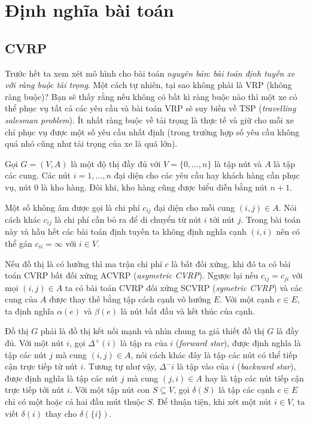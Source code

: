 \section{Định nghĩa bài toán}

\subsection{CVRP}

Trước hết ta xem xét mô hình cho bài toán \textit{nguyên bản}: \textit{bài toán định tuyến xe với ràng buộc tải trọng}. Một cách tự nhiên, tại sao không phải là VRP (không ràng buộc)? Bạn sẽ thấy rằng nếu không có bất kì ràng buộc nào thì một xe có thể phục vụ tất cả các yêu cầu và bài toán VRP sẽ suy biến về TSP (\textit{travelling salesman problem}). Ít nhất ràng buộc về tải trọng là thực tế và giữ cho mỗi xe chỉ phục vụ được một số yêu cầu nhất định (trong trường hợp số yêu cầu không quá nhỏ cũng như tải trọng của xe là quá lớn).


Gọi $G=(V,A)$ là một độ thị đầy đủ với $V=\{ 0, ..., n \}$ là tập nút và $A$ là tập các cung. Các nút $i=1,...,n$ đại diện cho các yêu cầu hay khách hàng cần phục vụ, nút $0$ là kho hàng. Đôi khi, kho hàng cũng được biểu diễn bằng nút $n+1$.

Một số không âm được gọi là chi phí $c_{ij}$ đại diện cho mỗi cung $(i,j) \in A$. Nói cách khác $c_{ij}$ là  chi phí cần bỏ ra để di chuyển từ nút $i$ tới nút $j$. Trong bài toán này và hầu hết các bài toán định tuyến ta không định nghĩa cạnh $(i,i)$ nên có thể gán $c_{ii} = \infty$ với $i \in V$.

Nếu đồ thị là có hướng thì ma trận chi phí $c$ là bất đối xứng, khi đó ta có bài toán CVRP bất đối xứng ACVRP (\textit{asymetric CVRP}). Ngược lại nếu $c_{ij} = c_{ji}$ với mọi $(i,j) \in A$ ta có bài toán CVRP đối xứng SCVRP (\textit{symetric CVRP}) và các cung của $A$ được thay thế bằng tập cách cạnh vô hướng $E$. Với một cạnh $e \in E$, ta định nghĩa $\alpha(e)$ và $\beta(e)$ là nút bắt đầu và kết thúc của cạnh.

Đồ thị $G$ phải là đồ thị kết nối mạnh và nhìn chung ta giả thiết đồ thị $G$ là đầy đủ. Với một nút $i$, gọi $\Delta^+(i)$ là tập ra của $i$ (\textit{forward star}), được định nghĩa là tập các nút $j$ mà cung $(i,j) \in A$, nói cách khác đây là tập các nút có thể tiếp cận trực tiếp từ nút $i$. Tương tự như vậy, $\Delta^-{i}$ là tập vào của $i$ (\textit{backward star}), được định nghĩa là tập các nút $j$ mà cung $(j,i) \in A$ hay là tập các nút tiếp cận trực tiếp tới nút $i$. Với một tập nút con $S \subseteq V$, gọi $\delta(S)$ là tập các cạnh $e \in E$ chỉ có một hoặc cả hai đầu mút thuộc $S$. Để thuận tiện, khi xét một nút $i \in V$, ta viết $\delta(i)$ thay cho $\delta(\{i\})$.

